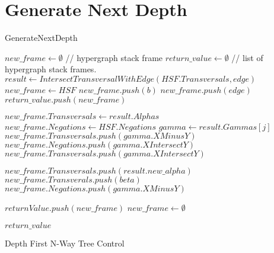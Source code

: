 \section{Generate Next Depth}
\begin{algorithm}
	\caption{GenerateNextDepth}\label{GenerateNextDepth}
	\begin{algorithmic}[1]
		\State $new\_frame \gets \emptyset $ // hypergraph stack frame
		\State $return\_value \gets \emptyset $  // list of hypergraph stack frames.
		\State $result \gets IntersectTransversalWithEdge(HSF.Transversals,edge)$
		\State $new\_frame \gets HSF$ 
		\State $new\_frame.push(b)$    
		\EndFor
		\Else
		\State $new\_frame.push(edge)$ 
		\EndIf
		\State $return\_value.push(new\_frame)$
		\EndIf
		\Else
		
			\State $new\_frame.Transversals \gets result.Alphas$
			\State $new\_frame.Negations \gets HSF.Negations$ 
				\State $gamma \gets result.Gammas[j]$
					\State $new\_frame.Transversals.push(gamma.XMinusY)$
					\State $new\_frame.Negations.push(gamma.XIntersectY)$
				\Else
					\State $new\_frame.Transversals.push(gamma.XIntersectY)$
				\EndIf
	
			\EndFor
				\State $new\_frame.Transversals.push(result.new\_alpha)$
				\EndIf
			\Else 
				\State $new\_frame.Transverals.push(beta)$
				\EndFor 
				\State $new\_frame.Negations.push(gamma.XMinusY)$
				\EndFor 
				\EndIf
			
			\EndIf
		\State $returnValue.push(new\_frame)$
		\State $new\_frame \gets \emptyset$
		\EndIf
		
		\EndFor
		\EndIf
		\State \Return $return\_value$
		\EndFunction
	\end{algorithmic}
\end{algorithm}


\newpage
Depth First N-Way Tree Control

